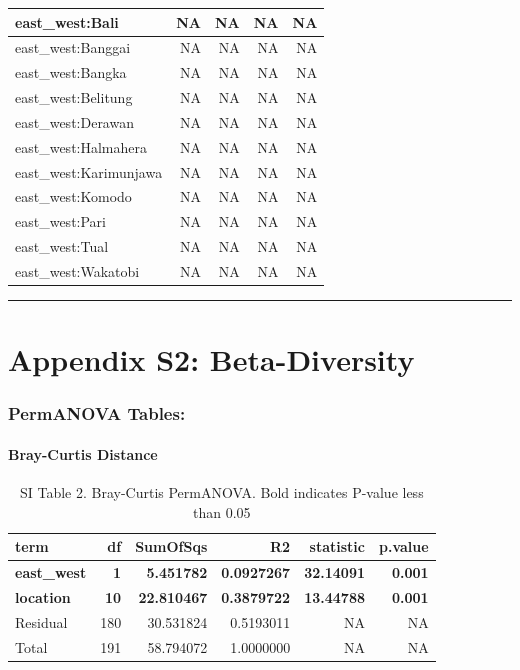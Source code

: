 \documentclass[
]{article}
\begin{document}
\begin{table}
\begin{tabular}[t]{l|r|r|r|r}
\hline
east\_west:Bali & NA & NA & NA & NA\\
\hline
east\_west:Banggai & NA & NA & NA & NA\\
\hline
east\_west:Bangka & NA & NA & NA & NA\\
\hline
east\_west:Belitung & NA & NA & NA & NA\\
\hline
east\_west:Derawan & NA & NA & NA & NA\\
\hline
east\_west:Halmahera & NA & NA & NA & NA\\
\hline
east\_west:Karimunjawa & NA & NA & NA & NA\\
\hline
east\_west:Komodo & NA & NA & NA & NA\\
\hline
east\_west:Pari & NA & NA & NA & NA\\
\hline
east\_west:Tual & NA & NA & NA & NA\\
\hline
east\_west:Wakatobi & NA & NA & NA & NA\\
\hline
\end{tabular}
\end{table}

\begin{center}\rule{0.5\linewidth}{0.5pt}\end{center}

\hypertarget{appendix-s2-beta-diversity}{%
\section{Appendix S2: Beta-Diversity}\label{appendix-s2-beta-diversity}}

\hypertarget{permanova-tables}{%
\subsubsection{PermANOVA Tables:}\label{permanova-tables}}

\hypertarget{bray-curtis-distance}{%
\paragraph{Bray-Curtis Distance}\label{bray-curtis-distance}}

\begin{table}

\caption{\label{tab:unnamed-chunk-3}SI Table 2. Bray-Curtis PermANOVA. Bold indicates P-value less than 0.05}
\centering
\begin{tabular}[t]{l|r|r|r|r|r}
\hline
term & df & SumOfSqs & R2 & statistic & p.value\\
\hline
\textbf{east\_west} & \textbf{1} & \textbf{5.451782} & \textbf{0.0927267} & \textbf{32.14091} & \textbf{0.001}\\
\hline
\textbf{location} & \textbf{10} & \textbf{22.810467} & \textbf{0.3879722} & \textbf{13.44788} & \textbf{0.001}\\
\hline
Residual & 180 & 30.531824 & 0.5193011 & NA & NA\\
\hline
Total & 191 & 58.794072 & 1.0000000 & NA & NA\\
\hline
\end{tabular}
\end{table}
\end{document}
